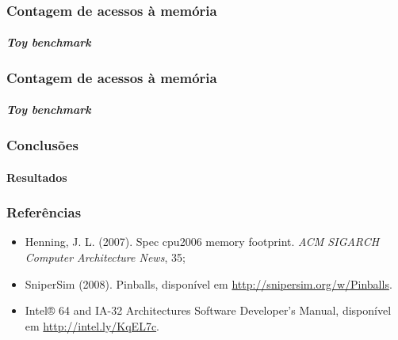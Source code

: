\documentclass[10pt]{beamer}
\begin{document}
\begin{frame}
\frametitle{Contagem de acessos à memória}
\framesubtitle{\textit{Toy benchmark}}

\begin{itemize}
\begin{itemize}

\end{itemize}

\end{itemize}

\end{frame}

\begin{frame}
\frametitle{Contagem de acessos à memória}
\framesubtitle{\textit{Toy benchmark}}

 
\end{frame}

\begin{frame}
\frametitle{Conclusões}
\framesubtitle{Resultados}

\begin{itemize}

\end{itemize}

\end{frame}


\begin{frame}
\frametitle{Referências}

\begin{itemize}
  \item Henning, J. L. (2007). Spec cpu2006 memory footprint. \textit{ACM
  SIGARCH Computer Architecture News}, 35;
  \vspace{14pt}
  \item SniperSim (2008). Pinballs, disponível em
  \url{http://snipersim.org/w/Pinballs}.
  \item Intel® 64 and IA-32 Architectures
Software Developer’s Manual, disponível em \url{http://intel.ly/KqEL7c}.
\end{itemize}

\end{frame}
\end{document}
